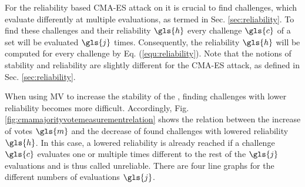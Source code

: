 For the reliability based \ac{CMA-ES} attack on \apufs it is crucial to find challenges, which evaluate differently at multiple evaluations, as termed in Sec. \ref{sec:reliability}.
To find these challenges and their reliability $\gls{h}$ every challenge $\gls{c}$ of a set will be evaluated $\gls{j}$ times.
Consequently, the reliability $\gls{h}$ will be computed for every challenge by Eq. (\ref{equ:reliability}).
Note that the notions of stability and reliability are slightly different for the \ac{CMA-ES} attack, as defined in Sec. \ref{sec:reliability}.

When using \ac{MV} to increase the stability of the \apuf, finding challenges with lower reliability becomes more difficult.
Accordingly, Fig. \ref{fig:cmamajorityvotemeasurementrelation} shows the relation between the increase of votes $\gls{m}$ and the decrease of found challenges with lowered reliability $\gls{h}$.
In this case, a lowered reliability is already reached if a challenge $\gls{c}$ evaluates one or multiple times different to the rest of the $\gls{j}$ evaluations and is thus called unreliable.
There are four line graphs for the different numbers of evaluations $\gls{j}$.


